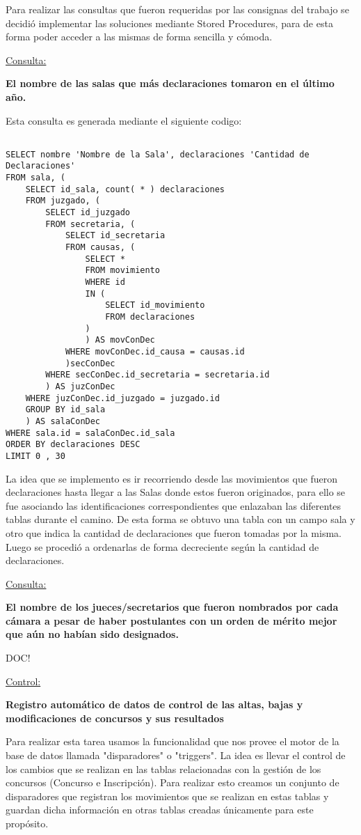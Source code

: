 Para realizar las consultas que fueron requeridas por las consignas del trabajo se decidió implementar las soluciones mediante Stored Procedures, para de esta forma poder acceder a las mismas de forma sencilla y cómoda.

\underline{Consulta:}

\textbf{El nombre de las salas que más declaraciones tomaron en el último año.}

Esta consulta es generada mediante el siguiente codigo:

\begin{verbatim}

SELECT nombre 'Nombre de la Sala', declaraciones 'Cantidad de Declaraciones'
FROM sala, (
	SELECT id_sala, count( * ) declaraciones
	FROM juzgado, (
		SELECT id_juzgado
		FROM secretaria, (
			SELECT id_secretaria
			FROM causas, (
				SELECT *
				FROM movimiento
				WHERE id
				IN (
					SELECT id_movimiento
					FROM declaraciones
				)
				) AS movConDec
			WHERE movConDec.id_causa = causas.id
			)secConDec
		WHERE secConDec.id_secretaria = secretaria.id
		) AS juzConDec
	WHERE juzConDec.id_juzgado = juzgado.id
	GROUP BY id_sala
	) AS salaConDec
WHERE sala.id = salaConDec.id_sala
ORDER BY declaraciones DESC
LIMIT 0 , 30

\end{verbatim}

La idea que se implemento es ir recorriendo desde las movimientos que fueron declaraciones hasta llegar a las Salas donde estos fueron originados, para ello se fue asociando las identificaciones correspondientes que enlazaban las diferentes tablas durante el camino. De esta forma se obtuvo una tabla con un campo sala y otro que indica la cantidad de declaraciones que fueron tomadas por la misma. Luego se procedió a ordenarlas de forma decreciente según la cantidad de declaraciones.

\underline{Consulta:}

\textbf{El nombre de los jueces/secretarios que fueron nombrados por cada cámara a pesar de haber postulantes con un orden de mérito mejor que aún no habían sido designados.}

DOC!

\underline{Control:}

\textbf{Registro automático de datos de control de las altas, bajas y modificaciones de concursos y sus resultados}

Para realizar esta tarea usamos la funcionalidad que nos provee el motor de la base de datos llamada "disparadores" o "triggers". La idea es llevar el control de los cambios que se realizan en las tablas relacionadas con la gestión de los concursos (Concurso e Inscripción). Para realizar esto creamos un conjunto de disparadores que registran los movimientos que se realizan en estas tablas y guardan dicha información en otras tablas creadas únicamente para este propósito.


